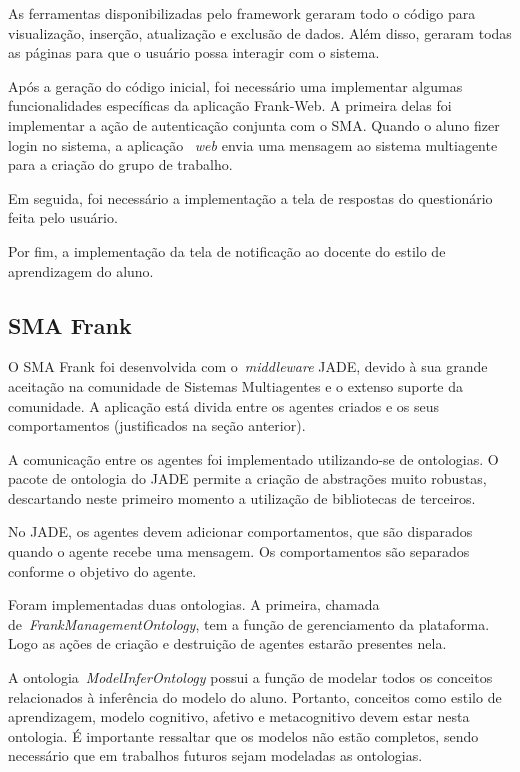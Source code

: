 As ferramentas disponibilizadas pelo framework geraram todo o código para visualização, inserção, atualização e exclusão de dados. Além disso, geraram todas as páginas para que o usuário possa interagir com o sistema. 

Após a geração do código inicial, foi necessário uma implementar algumas funcionalidades específicas da aplicação Frank-Web. A primeira delas foi implementar a ação de autenticação conjunta com o SMA. Quando o aluno fizer login no sistema, a aplicação ~\emph{web} envia uma mensagem ao sistema multiagente para a criação do grupo de trabalho.

Em seguida, foi necessário a implementação a tela de respostas do questionário feita pelo usuário.

Por fim, a implementação da tela de notificação ao docente do estilo de aprendizagem do aluno.

\subsection{SMA Frank}

O SMA Frank foi desenvolvida com o~\emph{middleware} JADE, devido à sua grande aceitação na comunidade de Sistemas Multiagentes e o extenso suporte da comunidade. A aplicação está divida entre os agentes criados e os seus comportamentos (justificados na seção anterior).

A comunicação entre os agentes foi implementado utilizando-se de ontologias. O pacote de ontologia do JADE permite a criação de abstrações muito robustas, descartando neste primeiro momento a utilização de bibliotecas de terceiros.

No JADE, os agentes devem adicionar comportamentos, que são disparados quando o agente recebe uma mensagem. Os comportamentos são separados conforme o objetivo do agente.

Foram implementadas duas ontologias. A primeira, chamada de~\emph{FrankManagementOntology}, tem a função de gerenciamento da plataforma. Logo as ações de criação e destruição de agentes estarão presentes nela.

A ontologia~\emph{ModelInferOntology} possui a função de modelar todos os conceitos relacionados à inferência do modelo do aluno. Portanto, conceitos como estilo de aprendizagem, modelo cognitivo, afetivo e metacognitivo devem estar nesta ontologia. É importante ressaltar que os modelos não estão completos, sendo necessário que em trabalhos futuros sejam modeladas as ontologias.

